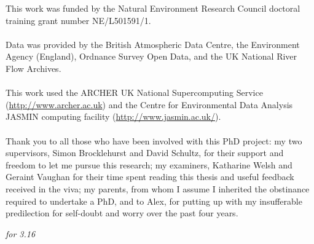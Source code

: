 \afterabstract
%
%
%
\noindent
This work was funded by the Natural Environment Research Council doctoral training grant number NE/L501591/1.
\\~\\
\noindent
Data was provided by the British Atmospheric Data Centre, the Environment Agency (England), Ordnance Survey Open Data, and the UK National River Flow Archives. 
\\~\\
\noindent
This work used the ARCHER UK National Supercomputing Service (\url{http://www.archer.ac.uk}) and the Centre for Environmental Data Analysis JASMIN computing facility (\url{http://www.jasmin.ac.uk/}).
\\~\\
\noindent
Thank you to all those who have been involved with this PhD project: my two supervisors, Simon Brocklehurst and David Schultz, for their support and freedom to let me pursue this research; my examiners, Katharine Welsh and Geraint Vaughan for their time spent reading this thesis and useful feedback received in the viva; my parents, from whom I assume I inherited the obstinance required to undertake a PhD, and to Alex, for putting up with my insufferable predilection for self-doubt and worry over the past four years.


\vfil
\newpage
\null

\vfil
\hfil {\Large\textit{for 3.16}\par} \hfil
\vfil
\afterpreface





